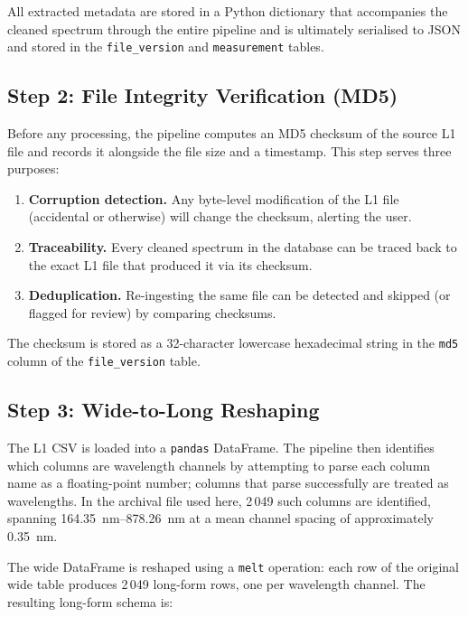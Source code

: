 \documentclass[a4paper,twocolumn,10pt]{article}
\begin{document}
All extracted metadata are stored in a Python dictionary that
accompanies the cleaned spectrum through the entire pipeline and is
ultimately serialised to JSON and stored in the \texttt{file\_version}
and \texttt{measurement} tables.

\subsection{Step 2: File Integrity Verification (MD5)}

Before any processing, the pipeline computes an MD5 checksum of the
source L1 file and records it alongside the file size and a
timestamp.  This step serves three purposes:

\begin{enumerate}[nosep,leftmargin=*]
  \item \textbf{Corruption detection.}  Any byte-level modification of
    the L1 file (accidental or otherwise) will change the checksum,
    alerting the user.
  \item \textbf{Traceability.}  Every cleaned spectrum in the database
    can be traced back to the exact L1 file that produced it via its
    checksum.
  \item \textbf{Deduplication.}  Re-ingesting the same file can be
    detected and skipped (or flagged for review) by comparing
    checksums.
\end{enumerate}

The checksum is stored as a 32-character lowercase hexadecimal string
in the \texttt{md5} column of the \texttt{file\_version} table.

\subsection{Step 3: Wide-to-Long Reshaping}

The L1 CSV is loaded into a \texttt{pandas} DataFrame.  The pipeline
then identifies which columns are wavelength channels by attempting to
parse each column name as a floating-point number; columns that parse
successfully are treated as wavelengths.  In the archival file used
here, 2\,049 such columns are identified, spanning
\SIrange{164.35}{878.26}{\nano\metre} at a mean channel spacing of
approximately \SI{0.35}{\nano\metre}.

The wide DataFrame is reshaped using a \texttt{melt} operation: each
row of the original wide table produces 2\,049 long-form rows, one
per wavelength channel.  The resulting long-form schema is:
\end{document}

